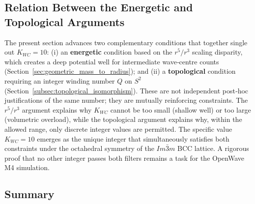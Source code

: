 \documentclass[10pt,a4paper]{article}
\begin{document}
\subsection{Relation Between the Energetic and Topological Arguments}
\label{sec:energetic_topological_relation}

The present section advances two complementary conditions that together
single out $K_{WC}=10$: (i) an \textbf{energetic} condition based on the
$r^{5}/r^{3}$ scaling disparity, which creates a deep potential well for
intermediate wave‑centre counts (Section~\ref{sec:geometric_mass_to_radius});
and (ii) a \textbf{topological} condition requiring an integer winding number
$Q$ on $S^{2}$ (Section~\ref{subsec:topological_isomorphism}).  These are
not independent post‑hoc justifications of the same number; they are mutually
reinforcing constraints.  The $r^{5}/r^{3}$ argument explains why $K_{WC}$ cannot
be too small (shallow well) or too large (volumetric overload), while the
topological argument explains why, within the allowed range, only discrete
integer values are permitted.  The specific value $K_{WC}=10$ emerges as the
unique integer that simultaneously satisfies both constraints under the
octahedral symmetry of the $Im\bar{3}m$ BCC lattice.  A rigorous proof that
no other integer passes both filters remains a task for the OpenWave M4
simulation.

\subsection{Summary}
\end{document}
